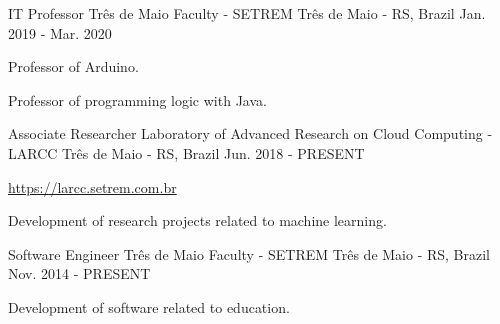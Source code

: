 
\begin{cventries}
	\cventry
	{IT Professor} %
	{Três de Maio Faculty - SETREM} %
	{Três de Maio - RS, Brazil} %
	{Jan. 2019 - Mar. 2020} %
	{
		\begin{cvitems} %
			\item {Professor of Arduino.}
			\item {Professor of programming logic with Java.}
		\end{cvitems}
	}

	\cventry
	{Associate Researcher} %
	{Laboratory of Advanced Research on Cloud Computing - LARCC} %
	{Três de Maio - RS, Brazil} %
	{Jun. 2018 - PRESENT} %
	{
		\begin{cvitems} %
			\item {\href{https://larcc.setrem.com.br}{https://larcc.setrem.com.br}}
			\item {Development of research projects related to machine learning.}
		\end{cvitems}
	}

	\cventry
	{Software Engineer} %
	{Três de Maio Faculty - SETREM} %
	{Três de Maio - RS, Brazil} %
	{Nov. 2014 - PRESENT} %
	{
		\begin{cvitems} %
			\item {Development of software related to education.}
		\end{cvitems}
	}
\end{cventries}
